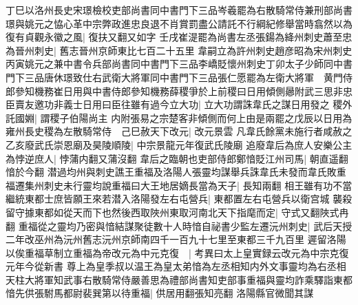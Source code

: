 丁巳以洛州長史宋璟檢校吏部尚書同中書門下三品岑羲罷為右散騎常侍兼刑部尚書璟與姚元之恊心革中宗弊政進忠良退不肖賞罰盡公請託不行綱紀修舉當時翕然以為復有貞觀永徽之風|{
	復扶又翻又如字}
壬戌崔湜罷為尚書左丞張鍚為絳州刺史蕭至忠為晉州刺史|{
	舊志晉州京師東比七百二十五里}
韋嗣立為許州刺史趙彦昭為宋州刺史丙寅姚元之兼中書令兵部尚書同中書門下三品李嶠貶懷州刺史丁卯太子少師同中書門下三品唐休璟致仕右武衛大將軍同中書門下三品張仁愿罷為左衛大將軍　黄門侍郎參知機務崔日用與中書侍郎參知機務薛稷爭於上前稷曰日用傾側曏附武三思非忠臣賣友邀功非義士日用曰臣往雖有過今立大功|{
	立大功謂誅韋氏之謀日用發之}
稷外託國婣|{
	謂稷子伯陽尚主}
内附張易之宗楚客非傾側而何上由是兩罷之戊辰以日用為雍州長史稷為左散騎常侍　己巳赦天下改元|{
	改元景雲}
凡韋氏餘黨未施行者咸赦之　乙亥廢武氏崇恩廟及昊陵順陵|{
	中宗景龍元年復武氏陵廟}
追廢韋后為庶人安樂公主為悖逆庶人|{
	悖蒲内翻又蒲沒翻}
韋后之臨朝也吏部侍郎鄭愔貶江州司馬|{
	朝直遥翻愔於今翻}
潜過均州與刺史譙王重福及洛陽人張靈均謀舉兵誅韋氏未發而韋氏敗重福遷集州刺史未行靈均說重福曰大王地居嫡長當為天子|{
	長知兩翻}
相王雖有功不當繼統東都士庶皆願王來若潜入洛陽發左右屯營兵|{
	東都置左右屯營兵以衛宫城}
襲殺留守據東都如從天而下也然後西取陜州東取河南北天下指麾而定|{
	守式又翻陜式冉翻}
重福從之靈均乃密與愔結謀聚徒數十人時愔自祕書少監左遷沅州刺史|{
	武后天授二年改巫州為沅州舊志沅州京師南四千一百九十七里至東都三千九百里}
遲留洛陽以俟重福草制立重福為帝改元為中元克復　|{
	考異曰太上皇實録云改元為中宗克復元年今從新書}
尊上為皇季叔以温王為皇太弟愔為左丞相知内外文事靈均為右丞相天柱大將軍知武事右散騎常侍嚴善思為禮部尚書知吏部事重福與靈均詐乘驛詣東都愔先供張駙馬都尉裴巽第以待重福|{
	供居用翻張知亮翻}
洛陽縣官微聞其謀

